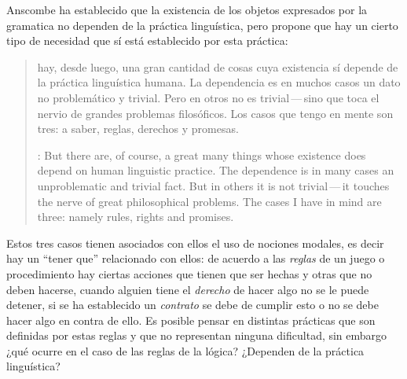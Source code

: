 Anscombe ha establecido que la existencia de los objetos expresados por la gramatica no dependen de la práctica linguística, pero propone que hay un cierto tipo de necesidad que sí está establecido por esta práctica: \blockquote[{\cite[118]{anscombe1981parmenides:qli}}: But there are, of course, a great many things whose existence does depend on human linguistic practice. The dependence is in many cases an unproblematic and trivial fact. But in others it is not trivial\,---\,it touches the nerve of great philosophical problems. The cases I have in mind are three: namely rules, rights and promises.]{hay, desde luego, una gran cantidad de cosas cuya existencia sí depende de la práctica linguística humana. La dependencia es en muchos casos un dato no problemático y trivial. Pero en otros no es trivial\,---\,sino que toca el nervio de grandes problemas filosóficos. Los casos que tengo en mente son tres: a saber, reglas, derechos y promesas.} Estos tres casos tienen asociados con ellos el uso de nociones modales, es decir hay un \enquote{tener que} relacionado con ellos: de acuerdo a las \emph{reglas} de un juego o procedimiento hay ciertas acciones que tienen que ser hechas y otras que no deben hacerse, cuando alguien tiene el \emph{derecho} de hacer algo no se le puede detener, si se ha establecido un \emph{contrato} se debe de cumplir esto o no se debe hacer algo en contra de ello. Es posible pensar en distintas prácticas que son definidas por estas reglas y que no representan ninguna dificultad, sin embargo ¿qué ocurre en el caso de las reglas de la lógica? ¿Dependen de la práctica linguística?


